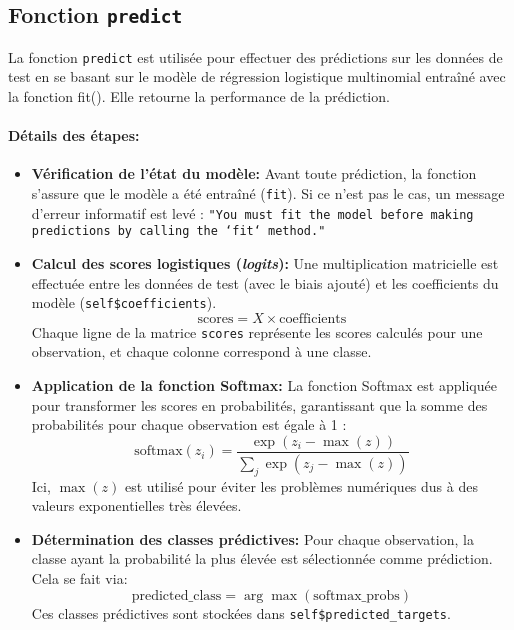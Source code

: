 \documentclass{rapport}
\begin{document}
\newpage

\subsection{Fonction \texttt{predict}}


La fonction \texttt{predict} est utilisée pour effectuer des prédictions sur les données de test en se basant sur le modèle de régression logistique multinomial entraîné avec la fonction fit(). Elle retourne la performance de la prédiction.

\paragraph{Détails des étapes:}
\begin{itemize}
    \item \textbf{Vérification de l'état du modèle:} 
    Avant toute prédiction, la fonction s’assure que le modèle a été entraîné (\texttt{fit}). Si ce n'est pas le cas, un message d'erreur informatif est levé : 
    \texttt{"You must fit the model before making predictions by calling the `fit` method."}

    \item \textbf{Calcul des scores logistiques (\textit{logits}):}
    Une multiplication matricielle est effectuée entre les données de test (avec le biais ajouté) et les coefficients du modèle (\texttt{self\$coefficients}). 
    \[
    \text{scores} = X \times \text{coefficients}
    \]
    Chaque ligne de la matrice \texttt{scores} représente les scores calculés pour une observation, et chaque colonne correspond à une classe.

    \item \textbf{Application de la fonction Softmax:}
    La fonction Softmax est appliquée pour transformer les scores en probabilités, garantissant que la somme des probabilités pour chaque observation est égale à 1 :
    \[
    \text{softmax}(z_i) = \frac{\exp(z_i - \max(z))}{\sum_j \exp(z_j - \max(z))}
    \]
    Ici, \(\max(z)\) est utilisé pour éviter les problèmes numériques dus à des valeurs exponentielles très élevées.

    \item \textbf{Détermination des classes prédictives:}
    Pour chaque observation, la classe ayant la probabilité la plus élevée est sélectionnée comme prédiction. Cela se fait via:
    \[
    \text{predicted\_class} = \arg\max(\text{softmax\_probs})
    \]
    Ces classes prédictives sont stockées dans \texttt{self\$predicted\_targets}.


\end{itemize}
\end{document}
